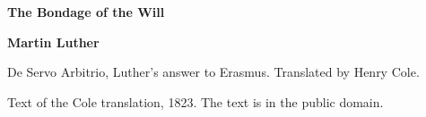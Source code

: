 \documentclass[11pt,letterpaper]{article}
\begin{document}
\color{ink}

\begin{titlepage}
\centering
\vspace*{4em}
{\LARGE\bfseries\color{heading} The Bondage of the Will\par}
\vspace{2em}
{\Large\bfseries\color{heading} Martin Luther\par}
\vspace{2.5em}
{\itshape\color{subhead}\parbox{0.8\linewidth}{\centering De Servo Arbitrio, Luther's answer to Erasmus. Translated by Henry Cole.\par}}
\vfill
{\small Text of the Cole translation, 1823. The text is in the public domain.\par}
\vspace{2em}
\end{titlepage}

\tableofcontents


\end{document}

